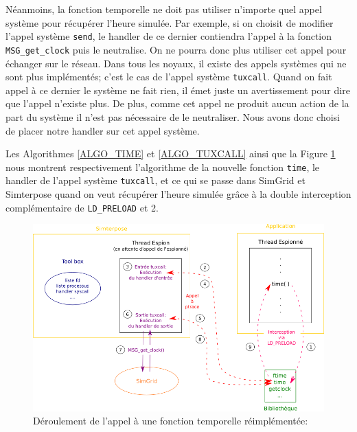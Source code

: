 Néanmoins, la fonction temporelle ne doit pas utiliser n'importe quel appel système pour récupérer l'heure simulée. Par exemple, si on choisit de modifier l'appel système \texttt{send}, le handler de ce dernier contiendra l'appel à la fonction \texttt{MSG\_get\_clock} puis le neutralise. On ne pourra donc plus utiliser cet appel pour échanger sur le réseau. Dans tous les noyaux, il existe des appels systèmes qui ne sont plus implémentés; c'est le cas de l'appel système \texttt{tuxcall}. Quand on fait appel à ce dernier le système ne fait rien, il émet juste un avertissement pour dire que l'appel n'existe plus. De plus, comme cet appel ne produit aucun action de la part du système il n'est pas nécessaire de le neutraliser. Nous avons donc choisi de placer notre handler sur cet appel système.

Les Algorithmes \ref{ALGO_TIME} et \ref{ALGO_TUXCALL} ainsi que la Figure \ref{time_interception} nous montrent respectivement l'algorithme de la nouvelle fonction \texttt{time}, le handler de l'appel système \texttt{tuxcall}, et ce qui se passe dans SimGrid et Simterpose quand on veut récupérer l'heure simulée grâce à la double interception complémentaire de \texttt{LD\_PRELOAD} et 2.

\begin{figure}[H]
  \centering
  \includegraphics[scale=0.7]{Pictures/png/Open_pandor}
  \caption[Déroulement de l'appel à une fonction temporelle réimplémentée]{Déroulement de l'appel à une fonction temporelle réimplémentée:}
  \label{time_interception}
\end{figure}

